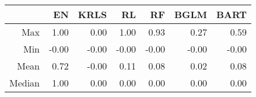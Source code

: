 \begin{table}[ht]
\centering
\begin{tabular}{rrrrrrr}
  \hline
 & EN & KRLS & RL & RF & BGLM & BART \\ 
  \hline
Max & 1.00 & 0.00 & 1.00 & 0.93 & 0.27 & 0.59 \\ 
  Min & -0.00 & -0.00 & -0.00 & -0.00 & -0.00 & -0.00 \\ 
  Mean & 0.72 & -0.00 & 0.11 & 0.08 & 0.02 & 0.08 \\ 
  Median & 1.00 & 0.00 & 0.00 & 0.00 & 0.00 & 0.00 \\ 
   \hline
\end{tabular}
\end{table}
